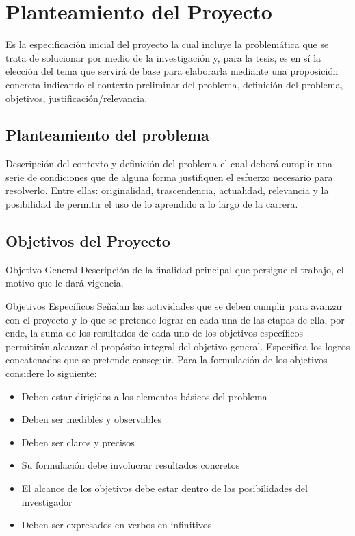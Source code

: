\chapter{Planteamiento del Proyecto}
Es la especificación inicial del proyecto la cual incluye la problemática que se trata de solucionar por medio de la investigación y, para la tesis, es en sí la elección del tema que servirá de base para elaborarla mediante una proposición concreta indicando el contexto preliminar del problema, definición del problema, objetivos, justificación/relevancia.

\section{Planteamiento del problema}
Descripción del contexto y definición del problema el cual deberá cumplir una serie de condiciones que de alguna forma justifiquen el esfuerzo necesario para resolverlo. Entre ellas: originalidad, trascendencia, actualidad, relevancia y la posibilidad de permitir el uso de lo aprendido a lo largo de la carrera.

\section{Objetivos del Proyecto}
\begin{subseccion}{Objetivo General}
Descripción de la finalidad principal que persigue el trabajo, el motivo que le dará vigencia. 
\end{subseccion}

\begin{subseccion}{Objetivos Específicos}
Señalan las actividades que se deben cumplir para avanzar con el proyecto y lo que se pretende lograr en cada una de las etapas de ella, por ende, la suma de los resultados de cada uno de los objetivos específicos permitirán alcanzar el propósito integral del objetivo general. Especifica los logros concatenados que se pretende conseguir.
Para la formulación de los objetivos considere lo siguiente:

\begin{itemize}
    \item Deben estar dirigidos a los elementos básicos del problema
    \item Deben ser medibles y observables
    \item Deben ser claros y precisos
    \item Su formulación debe involucrar resultados concretos
    \item El alcance de los objetivos debe estar dentro de las posibilidades del investigador
    \item Deben ser expresados en verbos en infinitivos
\end{itemize}
\end{subseccion}

